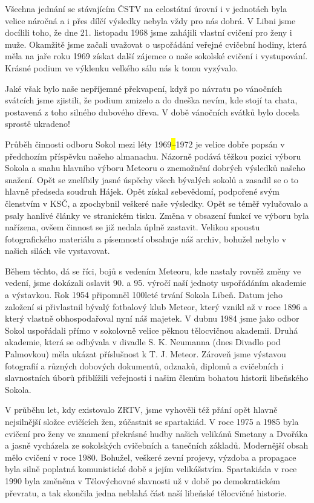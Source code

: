 Všechna jednání se stávajícím ČSTV na celostátní úrovní i v jednotách
byla velice náročná a i přes dílčí výsledky nebyla vždy pro nás dobrá. V
Libni jsme docílili toho, že dne 21. listopadu 1968 jsme zahájili
vlastní cvičení pro ženy i muže. Okamžitě jsme začali uvažovat o
uspořádání veřejné cvičební hodiny, která měla na jaře roku 1969 získat
další zájemce o naše sokolské cvičení i vystupování. Krásné podium ve
výklenku velkého sálu nás k tomu vyzývalo.

Jaké však bylo naše nepříjemné překvapení, když po návratu po vánočních
svátcích jsme zjistili, že podium zmizelo a do dneška nevím, kde stojí
ta chata, postavená z toho silného dubového dřeva. V době vánočních
svátků bylo docela sprostě ukradeno!

Průběh činnosti odboru Sokol mezi léty 1969\emph{\hl{--}}1972 je velice
dobře popsán v předchozím příspěvku našeho almanachu. Názorně podává
těžkou pozici výboru Sokola a snahu hlavního výboru Meteoru o znemožnění
dobrých výsledků našeho snažení. Opět se znelíbily jasné úspěchy všech
bývalých sokolů a zasadil se o to hlavně předseda soudruh Hájek. Opět
získal sebevědomí, podpořené svým členstvím v KSČ, a zpochybnil veškeré
naše výsledky. Opět se téměř vylučovalo a psaly hanlivé články ve
stranickém tisku. Změna v obsazení funkcí ve výboru byla nařízena, ovšem
činnost se již nedala úplně zastavit. Velikou spoustu fotografického
materiálu a písemností obsahuje náš archiv, bohužel nebylo v našich
silách vše vystavovat.

Během těchto, dá se říci, bojů s vedením Meteoru, kde nastaly rovněž
změny ve vedení, jsme dokázali oslavit 90. a 95. výročí naší jednoty
uspořádáním akademie a výstavkou. Rok 1954 připomněl 100leté trvání
Sokola Libeň. Datum jeho založení si přivlastnil bývalý fotbalový klub
Meteor, který vznikl až v roce 1896 a který vlastně obhospodařoval nyní
náš majetek. V dubnu 1984 jsme jako odbor Sokol uspořádali přímo v
sokolovně velice pěknou tělocvičnou akademii. Druhá akademie, která se
odbývala v divadle S. K. Neumanna (dnes Divadlo pod Palmovkou) měla
ukázat příslušnost k T. J. Meteor. Zároveň jsme výstavou fotografií a
různých dobových dokumentů, odznaků, diplomů a cvičebních i slavnostních
úborů přiblížili veřejnosti i našim členům bohatou historii libeňského
Sokola.

V průběhu let, kdy existovalo ZRTV, jsme vyhověli též přání opět hlavně
nejsilnější složce cvičících žen, zúčastnit se spartakiád. V roce 1975 a
1985 byla cvičení pro ženy ve znamení překrásné hudby našich velikánů
Smetany a Dvořáka a jasně vycházela ze sokolských cvičebních a tanečních
základů. Modernější obsah mělo cvičení v roce 1980. Bohužel, veškeré
zevní projevy, výzdoba a propagace byla silně poplatná komunistické době
s jejím velikášstvím. Spartakiáda v roce 1990 byla změněna v
Tělovýchovné slavnosti už v době po demokratickém převratu, a tak
skončila jedna neblahá část naší libeňské tělocvičné historie.

